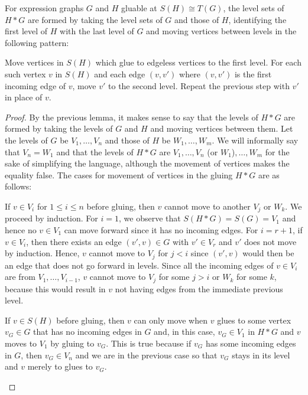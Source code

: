 \begin{thm}
For expression graphs $G$ and $H$ gluable at $S(H) \cong T(G)$,
the level sets of $H * G$ are formed by taking the level sets of $G$ and those
of $H$, identifying the first level of $H$ with the last level of $G$ and moving
vertices between levels in the following pattern:
\begin{enmrt}
\li Move vertices in $S(H)$ which glue to edgeless vertices to the first level.
\li For each such vertex $v$ in $S(H)$ and each edge $(v, v')$ where $(v, v')$
is the first incoming edge of $v$, move $v'$ to the second level.
\li Repeat the previous step with $v'$ in place of $v$.
\end{enmrt}
\end{thm}
\begin{proof}
By the previous lemma, it makes sense to say that the levels of $H * G$ are
formed by taking the levels of
$G$ and $H$ and moving vertices between them. Let the levels of $G$ be $V_1,
\dots, V_n$ and those of $H$ be $W_1, \dots, W_m$. We will informally say that
$V_n = W_1$ and that the levels of $H * G$ are
$V_1, \dots, V_n $ (or $W_1$)$, \dots, W_m$ for the sake of simplifying the
language, although the movement of vertices makes the equality false. The cases
for movement of vertices in the gluing $H * G$ are as follows:
\begin{enmrt}
\li If $v \in V_i$ for $1 \leq i \leq n$ before gluing, then $v$ cannot move to
another $V_j$ or $W_k$.
We proceed by induction. For $i = 1$, we observe that $S(H * G) = S(G) = V_1$
and hence no $v \in V_1$ can move forward since it has no incoming edges. For
$i = r + 1$, if $v \in V_i$, then there exists an edge $(v', v) \in G$ with
$v' \in V_{r}$ and $v'$ does not move by induction. Hence, $v$ cannot move to
$V_j$ for $j < i$ since $(v', v)$ would then be an edge that does not go forward
in levels. Since all the incoming edges of $v \in V_i$ are from
$V_1, \dots, V_{i - 1}$, $v$ cannot move to $V_j$ for some $j > i$ or $W_k$ for
some $k$, because this would result in $v$ not having edges from the immediate
previous level.

\li If $v \in S(H)$ before gluing, then $v$ can only move when $v$ glues to some
vertex $v_G \in G$ that has no incoming edges in $G$ and, in this case,
$v_G \in V_1$ in $H * G$ and $v$ moves to $V_1$ by gluing to $v_G$. This is true
because if $v_G$ has some incoming edges in $G$, then $v_G \in V_n$ and we are
in the previous case so that $v_G$ stays in its level and $v$ merely to glues to
$v_G$.


\end{enmrt}
\end{proof}

